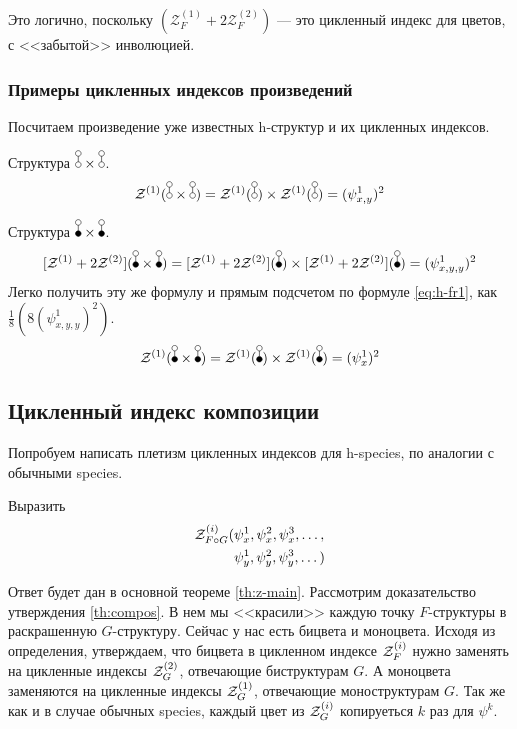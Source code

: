 \begin{remark}
Это логично, поскольку $(\mathcal Z_F^{(1)} + 2\mathcal Z_F^{(2)})$ --- это
цикленный индекс для цветов, с <<забытой>> инволюцией.
\end{remark}

\subsubsection{Примеры цикленных индексов произведений}
Посчитаем произведение уже известных h-структур и их цикленных индексов.

\begin{example}
Структура $\dA \times \dA$.
$$
\Zone(\dA \times \dA) = \Zone(\dA) \times \mathcal
Z^{(1)}(\dA) = (\psi_{x, y}^1)^2
$$
\end{example}
\begin{example}
Структура $\dB \times \dB$.
$$
\Zfull(\dB \times \dB) = \Zfull(\dB) \times \Zfull(\dB) =(\psi_{x, y, y}^1)^2
$$
Легко получить эту же формулу и прямым подсчетом по формуле \ref{eq:h-fr1}, как
$\frac{1}{8}(8(\psi_{x, y, y}^1)^2)$.
$$
\Zone(\dB \times \dB) = \Zone(\dB) \times \mathcal
Z^{(1)}(\dB) =(\psi_{x}^1)^2
$$
\end{example}

\subsection{Цикленный индекс композиции}
Попробуем написать плетизм цикленных индексов для h-species,
по аналогии с обычными species.

\begin{problem}
Выразить
\begin{equation*}
\begin{split}
\mathcal Z^{(i)}_{F \circ G} (&\psi_x^1, \psi_x^2, \psi_x^3, \dots, \\
						&\psi_y^1, \psi_y^2, \psi_y^3, \dots)
\end{split}
\end{equation*}
\end{problem}
Ответ будет дан в основной теореме \ref{th:z-main}. Рассмотрим доказательство
утверждения \ref{th:compos}. В нем мы <<красили>> каждую точку $F$-структуры в раскрашенную $G$-структуру. Сейчас у нас есть
бицвета и моноцвета. Исходя из определения, утверждаем, что
бицвета в цикленном индексе $\mathcal Z^{(i)}_F$ нужно заменять на
цикленные индексы $\mathcal Z^{(2)}_G$, отвечающие биструктурам $G$. А моноцвета заменяются
на цикленные индексы $\mathcal Z^{(1)}_G$, отвечающие моноструктурам $G$. Так же как и в
случае обычных species, каждый цвет из $\mathcal Z^{(i)}_G$ копируеться $k$ раз для $\psi^k$. 

